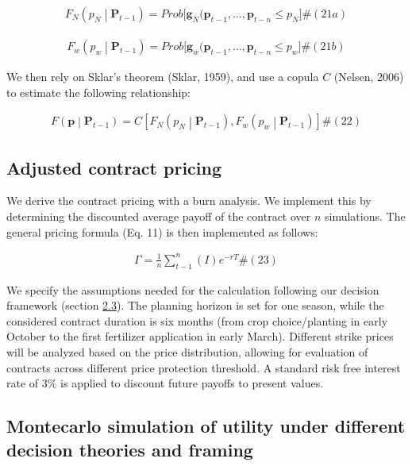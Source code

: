 \documentclass[
]{article}
\begin{document}
\[\begin{array}{r}
F_{N}\left( p_{N} \middle| \mathbf{P}_{t - 1} \right) = Prob\lbrack\mathbf{g}_{N}(\mathbf{p}_{t - 1},\ldots,\mathbf{p}_{t - n} \leq p_{N}\rbrack\#(21a)
\end{array}\]

\[\begin{array}{r}
F_{w}\left( p_{w} \middle| \mathbf{P}_{t - 1} \right) = Prob\lbrack\mathbf{g}_{w}(\mathbf{p}_{t - 1},\ldots,\mathbf{p}_{t - n} \leq p_{w}\rbrack\#(21b)
\end{array}\]

We then rely on Sklar's theorem (Sklar, 1959), and use a copula \(C\)
(Nelsen, 2006) to estimate the following relationship:

\[\begin{array}{r}
F\left( \mathbf{p} \middle| \mathbf{P}_{t - 1} \right) = C\left\lbrack F_{N}\left( p_{N} \middle| \mathbf{P}_{t - 1} \right),F_{w}\left( p_{w} \middle| \mathbf{P}_{t - 1} \right) \right\rbrack\#(22)
\end{array}\]

\subsection{\texorpdfstring{Adjusted contract pricing
}{Adjusted contract pricing }}\label{adjusted-contract-pricing}

We derive the contract pricing with a burn analysis. We implement this
by determining the discounted average payoff of the contract over \(n\)
simulations. The general pricing formula (Eq. 11) is then implemented as
follows:

\[\begin{array}{r}
\Gamma = \frac{1}{n}\sum_{t - 1}^{n}(I)e^{- rT}\#(23)
\end{array}\]

We specify the assumptions needed for the calculation following our
decision framework (section \hl{}\hyperref[economic-model]{2.3}). The
planning horizon is set for one season, while the considered contract
duration is six months (from crop choice/planting in early October to
the first fertilizer application in early March). Different strike
prices will be analyzed based on the price distribution, allowing for
evaluation of contracts across different price protection threshold. A
standard risk free interest rate of 3\% is applied to discount future
payoffs to present values.

\subsection{Montecarlo simulation of utility under different decision
theories and
framing}\label{montecarlo-simulation-of-utility-under-different-decision-theories-and-framing}
\end{document}
